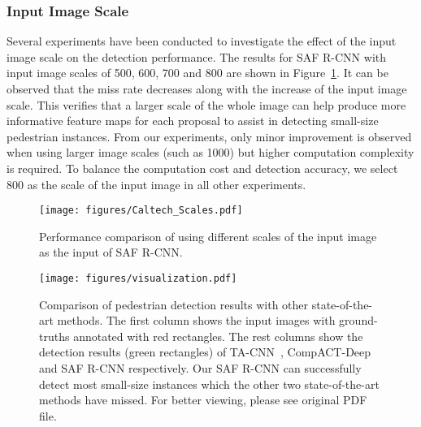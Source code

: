 \documentclass[journal]{IEEEtran}
\begin{document}
\subsubsection{Input Image Scale} 
Several experiments have been conducted to investigate the effect of the input image scale on the detection performance. The results for SAF R-CNN with input image scales of 500, 600, 700 and 800 are shown in  Figure~\ref{fig:Caltech_Scales}. It can be observed that the miss rate decreases along with the increase of the input image scale. This verifies that a larger scale of the whole image can help produce more informative feature maps for each proposal to assist in detecting small-size pedestrian instances. From our experiments, only minor improvement is observed when using larger image scales (such as 1000) but higher computation complexity is required. To balance the computation cost and detection accuracy, we select $800$ as the scale of the input image in all other experiments. 

\begin{figure}
	\begin{center}
		\texttt{[image: figures/Caltech\_Scales.pdf]}
		\caption{{Performance comparison of using different scales of the input image as the input of SAF R-CNN.}}	
		\label{fig:Caltech_Scales}
	\end{center}
	\vspace{-4mm}
\end{figure}

\begin{figure*}
	\begin{center}
		\texttt{[image: figures/visualization.pdf]}
		\caption{{Comparison of pedestrian detection results with other state-of-the-art methods. The first column shows the input images with ground-truths annotated with red rectangles. The rest columns show the detection results (green rectangles) of TA-CNN~\cite{ta_cnn}, CompACT-Deep~\cite{compact} and SAF R-CNN respectively. Our SAF R-CNN can successfully detect most small-size instances which the other two state-of-the-art methods have missed. For better viewing, please see original PDF file.}}	
		\label{fig:visualization}
	\end{center}
	\vspace{-4mm}
\end{figure*}
\end{document}
